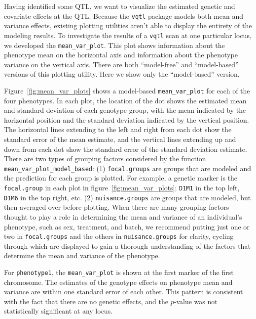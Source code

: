 \documentclass{article}
\begin{document}
Having identified some QTL, we want to visualize the estimated genetic and covariate effects at the QTL.
Because the \texttt{vqtl} package models both mean and variance effects, existing plotting utilities aren't able to display the entirety of the modeling results.
To investigate the results of a \texttt{vqtl} scan at one particular locus, we developed the \texttt{mean\_var\_plot}.
This plot shows information about the phenotype mean on the horizontal axis and information about the phenotype variance on the vertical axis.
There are both ``model-free'' and ``model-based'' versions of this plotting utility.
Here we show only the ``model-based'' version.

Figure~\ref{fig:mean_var_plots} shows a model-based \texttt{mean\_var\_plot} for each of the four phenotypes.
In each plot, the location of the dot shows the estimated mean and standard deviation of each genotype group, with the mean indicated by the horizontal position and the standard deviation indicated by the vertical position.
The horizontal lines extending to the left and right from each dot show the standard error of the mean estimate, and the vertical lines extending up and down from each dot show the standard error of the standard deviation estimate.
There are two types of grouping factors considered by the function \texttt{mean\_var\_plot\_model\_based}:
(1) \texttt{focal.groups} are groups that are modeled and the prediction for each group is plotted.
For example, a genetic marker is the \texttt{focal.group} in each plot in figure~\ref{fig:mean_var_plots}; \texttt{D1M1} in the top left, \texttt{D1M6} in the top right, etc.
(2) \texttt{nuisance.groups} are groups that are modeled, but then averaged over before plotting.
When there are many grouping factors thought to play a role in determining the mean and variance of an individual's phenotype, such as sex, treatment, and batch, we recommend putting just one or two in \texttt{focal.groups} and the others in \texttt{nuisance.groups} for clarity, cycling through which are displayed to gain a thorough understanding of the factors that determine the mean and variance of the phenotype.

For \texttt{phenotype1}, the \texttt{mean\_var\_plot} is shown at the first marker of the first chromosome.
The estimates of the genotype effects on phenotype mean and variance are within one standard error of each other.
This pattern is consistent with the fact that there are no genetic effects, and the $p$-value was not statistically significant at any locus.
\end{document}
